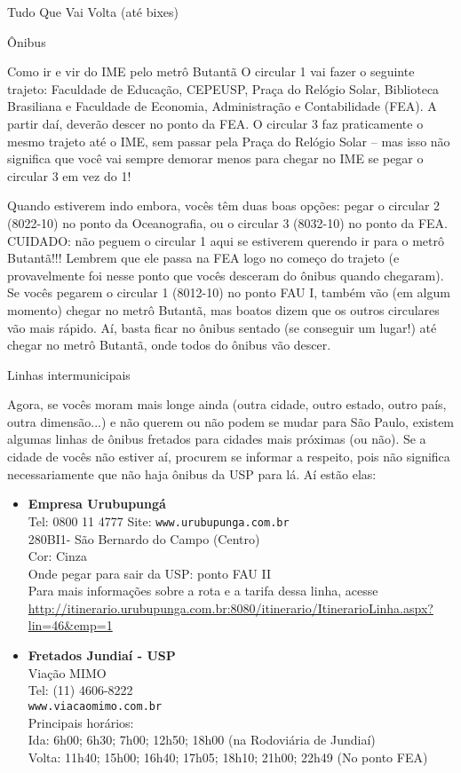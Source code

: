 \begin{secao}{Tudo Que Vai Volta (até bixes)}
\begin{subsecao}{Ônibus}
\begin{subsubsecao}{Como ir e vir do IME pelo metrô Butantã}
O circular 1 vai fazer o seguinte trajeto: Faculdade de Educação, CEPEUSP,
Praça do Relógio Solar, Biblioteca Brasiliana e Faculdade de Economia,
Administração e Contabilidade (FEA). A partir daí, deverão descer no ponto da
FEA. O circular 3 faz praticamente o mesmo trajeto até o IME, sem passar pela
Praça do Relógio Solar -- mas isso não significa que você vai sempre demorar
menos para chegar no IME se pegar o circular 3 em vez do 1!

Quando estiverem indo embora, vocês têm duas boas opções: pegar o circular 2
(8022-10) no ponto da Oceanografia, ou o circular 3 (8032-10) no ponto da FEA.
CUIDADO: não peguem o circular 1 aqui se estiverem querendo ir para o metrô
Butantã!!! Lembrem que ele passa na FEA logo no começo do trajeto
(e provavelmente foi nesse ponto que vocês desceram do ônibus quando chegaram).
Se vocês pegarem o circular 1 (8012-10) no ponto FAU I, também vão (em algum
momento) chegar no metrô Butantã, mas boatos dizem que os outros circulares vão
mais rápido. Aí, basta ficar no ônibus sentado (se conseguir um lugar!) até
chegar no metrô Butantã, onde todos do ônibus vão descer.

\end{subsubsecao}

\begin{subsubsecao}{Linhas intermunicipais}

Agora, se vocês moram mais longe ainda (outra cidade, outro estado, outro país,
outra dimensão...) e não querem ou não podem se mudar para São Paulo, existem
algumas linhas de ônibus fretados para cidades mais próximas (ou não). Se a
cidade de vocês não estiver aí, procurem se informar a respeito, pois não
significa necessariamente que não haja ônibus da USP para lá. Aí estão elas:

\begin{itemize}
  \item {\bf Empresa Urubupungá}\\
    Tel: 0800 11 4777
    Site: {\tt www.urubupunga.com.br}\\
    280BI1- São Bernardo do Campo (Centro)\\
    Cor: Cinza\\
    Onde pegar para sair da USP: ponto FAU II\\
    Para mais informações sobre a rota e a tarifa dessa linha, acesse
    \url{http://itinerario.urubupunga.com.br:8080/itinerario/ItinerarioLinha.aspx?lin=46\&emp=1}

  \item {\bf Fretados Jundiaí - USP}\\
    Viação MIMO\\
    Tel: (11) 4606-8222\\
    {\tt www.viacaomimo.com.br}\\
    Principais horários:\\
    Ida: 6h00; 6h30; 7h00; 12h50; 18h00 (na Rodoviária de Jundiaí)\\
    Volta: 11h40; 15h00; 16h40; 17h05; 18h10; 21h00; 22h49 (No ponto FEA)


\end{itemize}
\end{subsubsecao}
\end{subsecao}
\end{secao}
